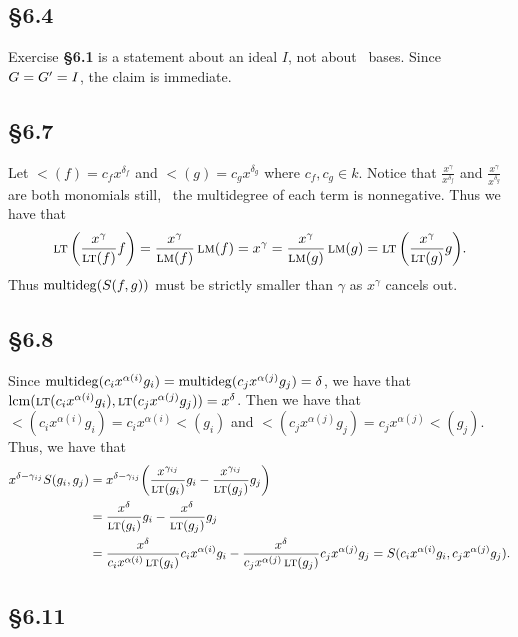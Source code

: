 \documentclass[letterpaper]{article}
\begin{document}
\subsection*{\S 6.4}

Exercise \textbf{\S 6.1} is a statement about an ideal $I$, not about \Grobner\ bases.
Since $\ideal{G} = \ideal{G'} = I$, the claim is immediate.

\subsection*{\S 6.7}

Let $\lt(f) = c_{f}x^{\delta_{f}}$ and $\lt(g) = c_{g}x^{\delta_{g}}$ where $c_{f}, c_{g} \in k$.
Notice that $\frac{x^{\gamma}}{x^{\delta_{f}}}$ and $\frac{x^{\gamma}}{x^{\delta_{g}}}$ are both monomials still, \ie\ the multidegree of each term is nonnegative.
Thus we have that
\[
  \lt\pqty{\frac{x^{\gamma}}{\lt(f)} f} = \frac{x^{\gamma}}{\lm(f)}\lm(f) = x^{\gamma} = \frac{x^{\gamma}}{\lm(g)}\lm(g) = \lt\pqty{\frac{x^{\gamma}}{\lt(g)} g}.
\]
Thus $\operatorname{multideg}(S(f, g))$ must be strictly smaller than $\gamma$ as $x^{\gamma}$ cancels out.

\subsection*{\S 6.8}

Since $\operatorname{multideg}(c_{i}x^{\alpha(i)}g_{i}) = \operatorname{multideg}(c_{j}x^{\alpha(j)}g_{j}) = \delta$, we have that $\operatorname{lcm}(\operatorname{\textsc{lt}}(c_{i}x^{\alpha(i)}g_{i}), \operatorname{\textsc{lt}}(c_{j}x^{\alpha(j)}g_{j})) = x^{\delta}$.
Then we have that $\lt(c_{i}x^{\alpha(i)}g_{i}) = c_{i}x^{\alpha(i)} \lt(g_{i})$ and $\lt(c_{j}x^{\alpha(j)}g_{j}) = c_{j}x^{\alpha(j)} \lt(g_{j})$.
Thus, we have that
\begin{align*}
  x^{\delta - \gamma_{ij}}S(g_{i}, g_{j}) &= x^{\delta - \gamma_{ij}} \pqty{\frac{x^{\gamma_{ij}}}{\lt(g_{i})} g_{i} - \frac{x^{\gamma_{ij}}}{\lt(g_{j})} g_{j}} \\
                                          &= \frac{x^{\delta}}{\lt(g_{i})}g_{i} - \frac{x^{\delta}}{\lt(g_{j})}g_{j} \\
                                          &= \frac{x^{\delta}}{c_{i}x^{\alpha(i)}\lt(g_{i})}c_{i}x^{\alpha(i)}g_{i} - \frac{x^{\delta}}{c_{j}x^{\alpha(j)}\lt(g_{j})}c_{j}x^{\alpha(j)}g_{j} = S(c_{i}x^{\alpha(i)}g_{i}, c_{j}x^{\alpha(j)}g_{j}).
\end{align*}

\subsection*{\S 6.11}
\end{document}
